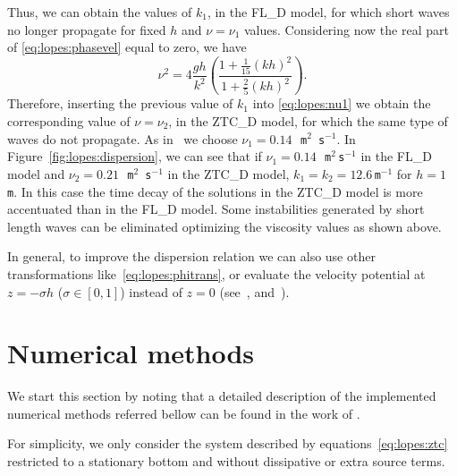 Thus, we can obtain the values of $k_1$, in the FL\_D model, for which
short waves no longer propagate for fixed $h$ and $\nu=\nu_1$ values.
Considering now the real part of \eqref{eq:lopes:phasevel} equal to
zero, we have
\begin{equation}
\label{eq:lopes:nu1}
\nu^2=4\frac{gh}{k^2}\left(\frac{1+\frac{1}{15}(kh)^2}{1 +
    \frac{2}{5}(kh)^2}\right).
\end{equation}
Therefore, inserting the previous value of $k_1$ into
\eqref{eq:lopes:nu1} we obtain the corresponding value of $\nu=\nu_2$,
in the ZTC\_D model, for which the same type of waves do not
propagate.  As in~\citet{DutykhDias2007} we choose $\nu_1=0.14$\,{\tt
m$^2$\,s$^{-1}$}.  In Figure~\ref{fig:lopes:dispersion}, we can see
that if $\nu_1=0.14\,$~{\tt m$^2\,$s$^{-1}$} in the FL\_D model and
$\nu_2=0.21\,$~{\tt m$^2$\,s$^{-1}$} in the ZTC\_D model,
$k_1=k_2=12.6$\,{\tt m$^{-1}$} for $h=1$\,{\tt m}.  In this case the
time decay of the solutions in the ZTC\_D model is more accentuated
than in the FL\_D model.  Some instabilities generated by short length
waves can be eliminated optimizing the viscosity values as shown
above.

In general, to improve the dispersion relation we can also use other
transformations like~\eqref{eq:lopes:phitrans}, or evaluate the
velocity potential at $z=-\sigma h$ ($\sigma\in[0,1]$) instead of
$z=0$ (see~\citet{BinghamMadsenFuhrman2008}, \citet{MadsenAgnon2003}
and~\citet{MadsenBinghamSchaffer2003}).

\section{Numerical methods}
\label{sec:lopes:numericalmethods}
We start this section by noting that a detailed description of the
implemented numerical methods referred bellow can be found in the work
of \citet{Lopes2007}.

For simplicity, we only consider the system described by
equations~\eqref{eq:lopes:ztc} restricted to a stationary bottom and
without dissipative or extra source terms.

